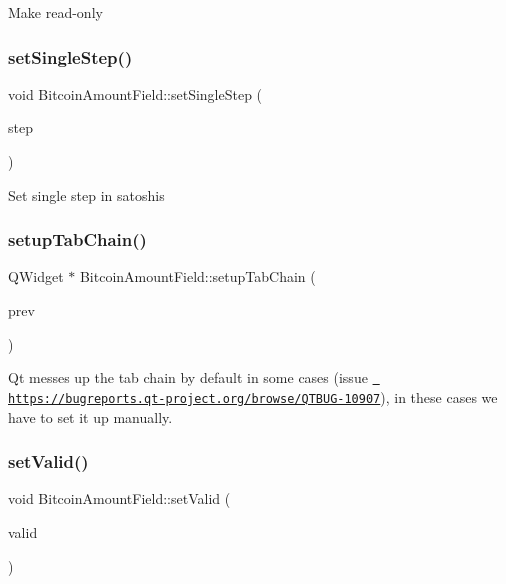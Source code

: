 Make read-\/only \mbox{\label{class_bitcoin_amount_field_a26ff92c23985e9ed79870311aed298c3}} 
\subsubsection{\texorpdfstring{setSingleStep()}{setSingleStep()}}
{\footnotesize\ttfamily void Bitcoin\+Amount\+Field\+::set\+Single\+Step (\begin{DoxyParamCaption}\item[{const C\+Amount \&}]{step }\end{DoxyParamCaption})}

Set single step in satoshis \mbox{\label{class_bitcoin_amount_field_aa48f6950f46333c9e781880ecc279408}} 
\subsubsection{\texorpdfstring{setupTabChain()}{setupTabChain()}}
{\footnotesize\ttfamily Q\+Widget $\ast$ Bitcoin\+Amount\+Field\+::setup\+Tab\+Chain (\begin{DoxyParamCaption}\item[{Q\+Widget $\ast$}]{prev }\end{DoxyParamCaption})}

Qt messes up the tab chain by default in some cases (issue \href{https://bugreports.qt-project.org/browse/QTBUG-10907}{\texttt{ https\+://bugreports.\+qt-\/project.\+org/browse/\+Q\+T\+B\+U\+G-\/10907}}), in these cases we have to set it up manually. \mbox{\label{class_bitcoin_amount_field_ac4ca86e405804bad9689d74160e962de}} 
\subsubsection{\texorpdfstring{setValid()}{setValid()}}
{\footnotesize\ttfamily void Bitcoin\+Amount\+Field\+::set\+Valid (\begin{DoxyParamCaption}\item[{bool}]{valid }\end{DoxyParamCaption})}

